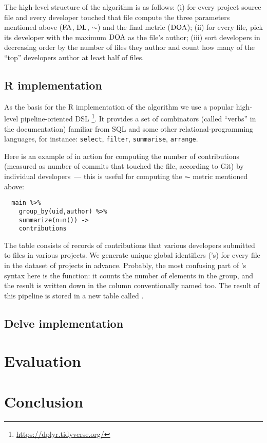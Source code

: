 The high-level structure of the algorithm is as follows: (i) for every project
source file and every developer touched that file compute the three
parameters mentioned above ($\operatorname{FA}$, $\operatorname{DL}$, $\AC$) and the final metric ($\operatorname{DOA}$);
(ii) for every file, pick its developer with the maximum $\operatorname{DOA}$ as the file's
author; (iii) sort developers in decreasing order by the number of files
they author and count how many of the ``top'' developers author at least
half of files.

\subsection{R implementation}

As the basis for the R implementation of the algorithm we use a popular high-level
pipeline-oriented DSL \dplyr\footnote{%
\url{https://dplyr.tidyverse.org/}%
}. It provides a set of combinators (called ``verbs'' in the documentation)
familiar from SQL and some other relational-programming languages, for instance:
\texttt{select},
\texttt{filter},
\texttt{summarise},
\texttt{arrange}.

Here is an example of \dplyr in action for computing the number of contributions
(measured as number of commits that touched the file, according to Git) by individual
developers~--- this is useful for computing the $\AC$ metric mentioned above:
\begin{verbatim}
  main %>%
    group_by(uid,author) %>%
    summarize(n=n()) ->
    contributions
\end{verbatim}
The  table consists of records of contributions that various developers
submitted to files in various projects.
We generate unique global identifiers ('s) for every file in the
dataset of projects in advance. Probably, the most confusing part of \dplyr's
syntax here is the  function: it counts the number of elements in the
group, and the result is written down in the column conventionally named 
too. The result of this pipeline is stored in a new table called .


\subsection{Delve implementation}

\section{Evaluation}

\section{Conclusion}
